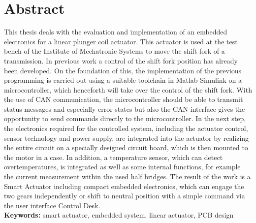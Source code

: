 \documentclass[nochapterpage,bigchapter,linedtoc,longdoc,colorback,accentcolor=tud1c]{tudreport}
\begin{document}
\section*{Abstract}
This thesis deals with the evaluation and implementation of an embedded electronics for a linear plunger coil actuator.  This actuator is used at the test bench of the Institute of Mechatronic Systems to move the shift fork of a transmission.
In previous work a control of the shift fork position has already been developed. On the foundation of this, the implementation of the previous programming is carried out using a suitable toolchain in Matlab-Simulink on a microcontroller, which henceforth will take over the control of the shift fork. With the use of CAN communication, the microcontroller should be able to transmit status messages and especially error states but also the CAN interface gives the opportunity to send commands directly to the microcontroller. In the next step, the electronics required for the controlled system, including the actuator control, sensor technology and power supply, are integrated into the actuator by realizing the entire circuit on a specially designed circuit board, which is then mounted to the motor in a case. In addition, a temperature sensor, which can detect overtemperatures, is integrated as well as some internal functions, for example the current measurement within the used half bridges.  The result of the work is a Smart Actuator including compact embedded electronics, which can engage the two gears independently or shift to neutral position with a simple command via the user interface Control Desk.\\

\textbf{Keywords:} smart actuator, embedded system, linear actuator, PCB design
\cleardoublepage
{}
{}
\listoffigures
\newpage
{}
{}
\tableofcontents

\newpage
{}








\newpage
{}
{}
\printbibliography[title=Literaturverzeichnis]


\end{document}
